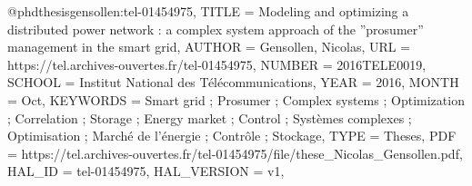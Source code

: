@phdthesis{gensollen:tel-01454975,
  TITLE = {{Modeling and optimizing a distributed power network : a complex system approach of the ''prosumer'' management in the smart grid}},
  AUTHOR = {Gensollen, Nicolas},
  URL = {https://tel.archives-ouvertes.fr/tel-01454975},
  NUMBER = {2016TELE0019},
  SCHOOL = {{Institut National des T{\'e}l{\'e}communications}},
  YEAR = {2016},
  MONTH = Oct,
  KEYWORDS = {Smart grid ; Prosumer ; Complex systems ; Optimization ; Correlation ; Storage ; Energy market ; Control ; Syst{\`e}mes complexes ; Optimisation ; March{\'e} de l'{\'e}nergie ; Contr{\^o}le ; Stockage},
  TYPE = {Theses},
  PDF = {https://tel.archives-ouvertes.fr/tel-01454975/file/these_Nicolas_Gensollen.pdf},
  HAL_ID = {tel-01454975},
  HAL_VERSION = {v1},
}
